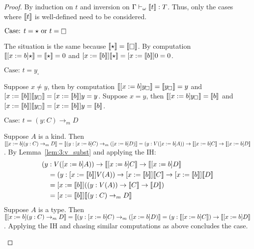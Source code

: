 \begin{proof}
    By induction on $t$ and inversion on $\Gamma \vdash_\omega \llbracket t \rrbracket : T$.
    Thus, only the cases where $\llbracket t \rrbracket$ is well-defined need to be considered.

    $\text{Case: } t = \star \text{ or } t = \kind$
    \begin{proofcase}
        The situation is the same because $\sema{\star} = \sema{\kind}$.
        By computation $\llbracket [x := b]\star \rrbracket = \llbracket \star \rrbracket = 0$ and $[x := \llbracket b \rrbracket]\llbracket \star \rrbracket = [x := \llbracket b \rrbracket]0 = 0$.
    \end{proofcase}

    $\text{Case: } t = y_\square$
    \begin{proofcase}
        Suppose $x \neq y$, then by computation $\llbracket [x := b]y_\square \rrbracket = \llbracket y_\square \rrbracket = y$ and $[x := \llbracket b \rrbracket]\llbracket y_\square \rrbracket = [x := \llbracket b \rrbracket]y = y$.
        Suppose $x = y$, then $\llbracket [x := b]y_\square \rrbracket = \llbracket b \rrbracket$ and $[x := \llbracket b \rrbracket]\llbracket y_\square \rrbracket = [x := \llbracket b \rrbracket]y = \llbracket b \rrbracket$.
    \end{proofcase}

    $\text{Case: } t = (y : C) \to_m D$
    \begin{proofcase}
        Suppose $A$ is a kind.
        Then $\llbracket [x := b](y : C) \to_m D \rrbracket = \llbracket (y : [x := b]C) \to_m ([x := b]D) \rrbracket = (y : V([x := b]A)) \to \llbracket [x := b]C \rrbracket \to \llbracket [x := b]D \rrbracket$.
        By Lemma~\ref{lem:3:v_subst} and applying the IH:
        \begin{align*}
            (y &: V([x := b]A)) \to \llbracket [x := b]C \rrbracket \to \llbracket [x := b]D \rrbracket \\
            &= (y : [x := \llbracket b \rrbracket]V(A)) \to [x := \llbracket b \rrbracket]\llbracket C \rrbracket \to [x := \llbracket b \rrbracket]\llbracket D \rrbracket \\
            &= [x := \llbracket b \rrbracket]((y : V(A)) \to \llbracket C \rrbracket \to \llbracket D \rrbracket) \\
            &= [x := \llbracket b \rrbracket]\llbracket (y : C) \to_m D \rrbracket
        \end{align*}
        Suppose $A$ is a type.
        Then $\llbracket [x := b](y : C) \to_m D \rrbracket = \llbracket (y : [x := b]C) \to_m ([x := b]D) \rrbracket = (y : \llbracket [x := b]C \rrbracket) \to \llbracket [x := b]D \rrbracket$.
        Applying the IH and chasing similar computations as above concludes the case.
    \end{proofcase}


\end{proof}
